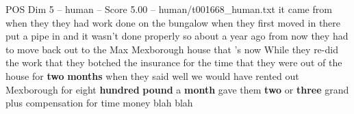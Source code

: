 \begin{textsample}{POS Dim 5 – human – Score 5.00 – human/t001668\_human.txt}  \label{ex:f5_pos_007}
it came from when they they had work done on the bungalow when they first moved in there put a pipe in and it wasn't done properly so about a year ago from now they had to move back out to the Max Mexborough house that 's now While they re-did the work that they botched the insurance for the time that they were out of the house for \textbf{two} \textbf{months} when they said well we would have rented out Mexborough for eight \textbf{hundred} \textbf{pound} a \textbf{month} gave them \textbf{two} or \textbf{three} grand plus compensation for time money blah blah

\end{textsample}
